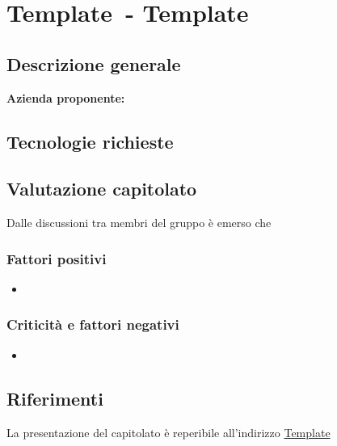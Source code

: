 
\renewcommand{\capName}{Template} %
\renewcommand{\capCode}{Template} %
\renewcommand{\capLink}{Template} %
\renewcommand{\capProposer}{Template} %


\section{\capCode\ - \capName} 
\subsection{Descrizione generale}
\textbf{Azienda proponente:}


\subsection{Tecnologie richieste}

\subsection{Valutazione capitolato}
Dalle discussioni tra membri del gruppo è emerso che

\subsubsection{Fattori positivi}

\begin{itemize}
    \item 
\end{itemize}

\subsubsection{Criticità e fattori negativi}

\begin{itemize}
    \item 
\end{itemize}

\subsection{Riferimenti}
La presentazione del capitolato è reperibile all'indirizzo \url{\capLink}